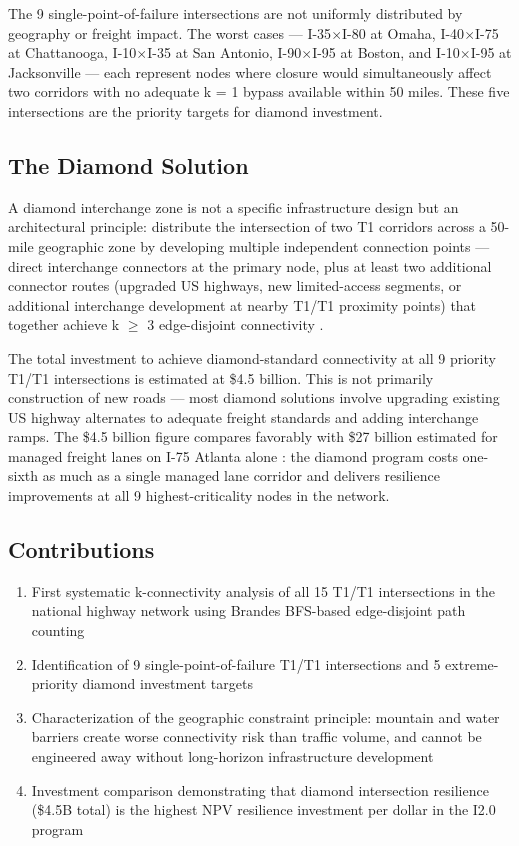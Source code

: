 The 9 single-point-of-failure intersections are not uniformly distributed by geography or freight impact. The worst cases --- I-35$\times$I-80 at Omaha, I-40$\times$I-75 at Chattanooga, I-10$\times$I-35 at San Antonio, I-90$\times$I-95 at Boston, and I-10$\times$I-95 at Jacksonville --- each represent nodes where closure would simultaneously affect two corridors with no adequate k = 1 bypass available within 50 miles. These five intersections are the priority targets for diamond investment.

\subsection*{The Diamond Solution}

A diamond interchange zone is not a specific infrastructure design but an architectural principle: distribute the intersection of two T1 corridors across a 50-mile geographic zone by developing multiple independent connection points --- direct interchange connectors at the primary node, plus at least two additional connector routes (upgraded US highways, new limited-access segments, or additional interchange development at nearby T1/T1 proximity points) that together achieve k $\geq$ 3 edge-disjoint connectivity \citep{ROUTE_B4}.

The total investment to achieve diamond-standard connectivity at all 9 priority T1/T1 intersections is estimated at \$4.5 billion. This is not primarily construction of new roads --- most diamond solutions involve upgrading existing US highway alternates to adequate freight standards and adding interchange ramps. The \$4.5 billion figure compares favorably with \$27 billion estimated for managed freight lanes on I-75 Atlanta alone \citep{ROUTE_E1}: the diamond program costs one-sixth as much as a single managed lane corridor and delivers resilience improvements at all 9 highest-criticality nodes in the network.

\subsection*{Contributions}

\begin{enumerate}
\item First systematic k-connectivity analysis of all 15 T1/T1 intersections in the national highway network using Brandes BFS-based edge-disjoint path counting
\item Identification of 9 single-point-of-failure T1/T1 intersections and 5 extreme-priority diamond investment targets
\item Characterization of the geographic constraint principle: mountain and water barriers create worse connectivity risk than traffic volume, and cannot be engineered away without long-horizon infrastructure development
\item Investment comparison demonstrating that diamond intersection resilience (\$4.5B total) is the highest NPV resilience investment per dollar in the I2.0 program
\end{enumerate}
